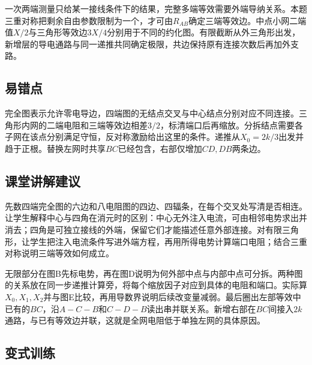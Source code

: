 \documentclass[UTF8,fontset=fandol,a4paper,11pt]{ctexart}
\begin{document}
一次两端测量只给某一接线条件下的结果，完整多端等效需要外端导纳关系。本题三重对称把剩余自由参数限制为一个，才可由$R_{AB}$确定三端等效边。中点小网二端值$X/2$与三角形等效边$3X/4$分别用于不同的约化图。有限截断从外三角形出发，新增层的导电通路与同一递推共同确定极限，共边保持原有连接次数后再加外支路。



\subsection*{易错点}

完全图表示允许零电导边，四端图的无结点交叉与中心结点分别对应不同连接。三角形内网的二端电阻和三端等效边相差$3/2$，标清端口后再缩放。分拆结点需要各子网在该点分别满足守恒，反对称激励给出这里的条件。递推从$X_0=2k/3$出发并趋于正根。替换左网时共享$BC$已经包含，右部仅增加$CD,DB$两条边。



\subsection*{课堂讲解建议}

先数四端完全图的六边和八电阻图的四边、四辐条，在每个交叉处写清是否相连。让学生解释中心与四角在消元时的区别：中心无外注入电流，可由相邻电势求出并消去；四角是可独立接线的外端，保留它们才能描述任意外部连接。对有限三角形，让学生把注入电流条件写进外端方程，再用所得电势计算端口电阻；结合三重对称说明三端等效如何成立。

无限部分在图B先标电势，再在图D说明为何外部中点与内部中点可分拆。两种图的关系放在同一步递推计算旁，将每个缩放因子对应到具体的电阻和端口。实际算$X_0,X_1,X_2$并与图E比较，再用导数界说明后续改变量减弱。最后圈出左部等效中已有的$BC$，沿$A-C-B$和$C-D-B$读出串并联关系。新增右部在$BC$间接入$2k$通路，与已有等效边并联，这就是全网电阻低于单独左网的具体原因。



\subsection*{变式训练}
\end{document}
